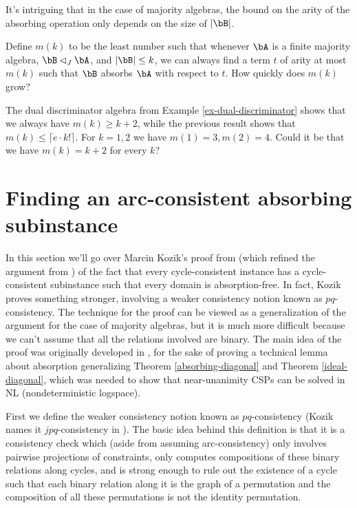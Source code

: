 \begin{rem} It's intriguing that in the case of majority algebras, the bound on the arity of the absorbing operation only depends on the size of $|\bB|$.
\end{rem}

\begin{prob} Define $m(k)$ to be the least number such that whenever $\bA$ is a finite majority algebra, $\bB \lhd_J \bA$, and $|\bB| \le k$, we can always find a term $t$ of arity at most $m(k)$ such that $\bB$ absorbs $\bA$ with respect to $t$. How quickly does $m(k)$ grow?
\end{prob}

The dual discriminator algebra from Example \ref{ex-dual-discriminator} shows that we always have $m(k) \ge k+2$, while the previous result shows that $m(k) \le \lceil e\cdot k!\rceil$. For $k = 1,2$ we have $m(1) = 3, m(2) = 4$. Could it be that we have $m(k) = k+2$ for every $k$?





\section{Finding an arc-consistent absorbing subinstance}\label{s-absorbing-arc-consistent}

In this section we'll go over Marcin Kozik's proof from \cite{pq-consistency} (which refined the argument from \cite{slac}) of the fact that every cycle-consistent instance has a cycle-consistent subinstance such that every domain is absorption-free. In fact, Kozik proves something stronger, involving a weaker consistency notion known as $pq$-consistency. The technique for the proof can be viewed as a generalization of the argument for the case of majority algebras, but it is much more difficult because we can't assume that all the relations involved are binary. The main idea of the proof was originally developed in \cite{nu-pathwidth}, for the sake of proving a technical lemma about absorption generalizing Theorem \ref{absorbing-diagonal} and Theorem \ref{ideal-diagonal}, which was needed to show that near-unanimity CSPs can be solved in NL (nondeterministic logspace).

First we define the weaker consistency notion known as $pq$-consistency (Kozik names it $jpq$-consistency in \cite{pq-consistency}). The basic idea behind this definition is that it is a consistency check which (aside from assuming arc-consistency) only involves pairwise projections of constraints, only computes compositions of these binary relations along cycles, and is strong enough to rule out the existence of a cycle such that each binary relation along it is the graph of a permutation and the composition of all these permutations is not the identity permutation.%


